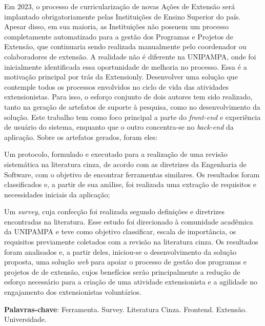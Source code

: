 \begin{resumo}
  Em 2023, o processo de curricularização de novas Ações de Extensão será implantado obrigatoriamente pelas Instituições de Ensino Superior do país. Apesar disso, em sua maioria, as Instituições não possuem um processo completamente automatizado para a gestão dos Programas e Projetos de Extensão, que continuaria sendo realizada manualmente pelo coordenador ou colaboradores de extensão. A realidade não é diferente na \acs{UNIPAMPA}, onde foi inicialmente identificada essa oportunidade de melhoria no processo. Essa é a motivação principal por trás da Extensionly. Desenvolver uma solução que contemple todos os processos envolvidos no ciclo de vida das atividades extensionistas. Para isso, o esforço conjunto de dois autores tem sido realizado, tanto na geração de artefatos de suporte à pesquisa, como no desenvolvimento da solução. Este trabalho tem como foco principal a parte do \textit{front-end} e experiência de usuário do sistema, enquanto que o outro concentra-se no \textit{back-end} da aplicação. Sobre os artefatos gerados, foram eles:
  \begin{inparaenum}[(a)]
    \item Um protocolo, formulado e executado para a realização de uma revisão sistemática na literatura cinza, de acordo com as diretrizes da Engenharia de Software, com o objetivo de encontrar ferramentas similares. Os resultados foram classificados e, a partir de sua análise, foi realizada uma extração de requisitos e necessidades iniciais da aplicação;
    \item Um \textit{survey}, cuja confecção foi realizada segundo definições e diretrizes encontradas na literatura. Esse estudo foi direcionado à comunidade acadêmica da \ac{UNIPAMPA} e teve como objetivo classificar, escala de importância, os requisitos previamente coletados com a revisão na literatura cinza. Os resultados foram analisados e, a partir deles, iniciou-se o desenvolvimento da solução proposta, uma solução \textit{web} para apoiar o processo de gestão dos programas e projetos de de extensão, cujos benefícios serão principalmente a redução de esforço necessário para a criação de uma atividade extensionista e a agilidade no engajamento dos extensionistas voluntários.
  \end{inparaenum}

  \vspace{\onelineskip}

  \noindent
  \textbf{Palavras-chave}: Ferramenta. Survey. Literatura Cinza. Frontend. Extensão. Universidade.
\end{resumo}
